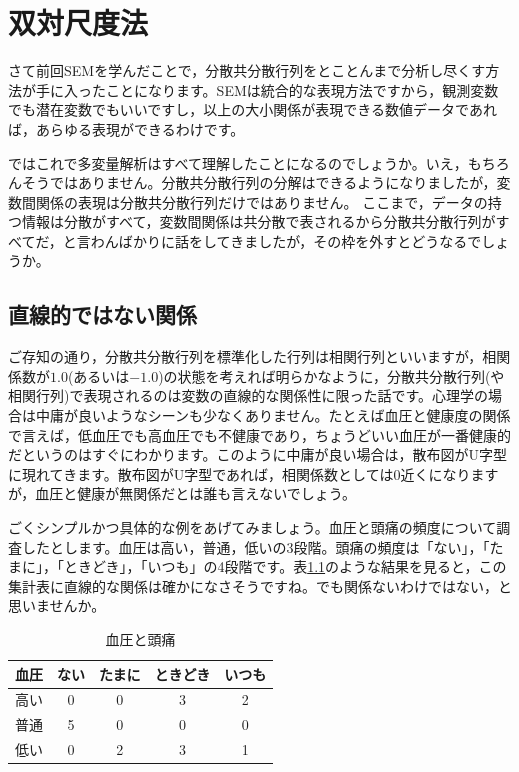 \documentclass{ltjsbook}
\begin{document}
\chapter{双対尺度法}
\label{x14_DualScaling}


さて前回SEMを学んだことで，分散共分散行列をとことんまで分析し尽くす方法が手に入ったことになります。SEMは統合的な表現方法ですから，観測変数でも潜在変数でもいいですし，以上の大小関係が表現できる数値データであれば，あらゆる表現ができるわけです。

ではこれで多変量解析はすべて理解したことになるのでしょうか。いえ，もちろんそうではありません。分散共分散行列の分解はできるようになりましたが，変数間関係の表現は分散共分散行列だけではありません。
ここまで，データの持つ情報は分散がすべて，変数間関係は共分散で表されるから分散共分散行列がすべてだ，と言わんばかりに話をしてきましたが，その枠を外すとどうなるでしょうか。

\section{直線的ではない関係}

ご存知の通り，分散共分散行列を標準化した行列は相関行列といいますが，相関係数が$1.0$(あるいは$-1.0$)の状態を考えれば明らかなように，分散共分散行列(や相関行列)で表現されるのは変数の直線的な関係性に限った話です。心理学の場合は中庸が良いようなシーンも少なくありません。たとえば血圧と健康度の関係で言えば，低血圧でも高血圧でも不健康であり，ちょうどいい血圧が一番健康的だというのはすぐにわかります。このように中庸が良い場合は，散布図がU字型に現れてきます。散布図がU字型であれば，相関係数としては0近くになりますが，血圧と健康が無関係だとは誰も言えないでしょう。

ごくシンプルかつ具体的な例をあげてみましょう。血圧と頭痛の頻度について調査したとします。血圧は高い，普通，低いの3段階。頭痛の頻度は「ない」，「たまに」，「ときどき」，「いつも」の4段階です。表\ref{tbl:14_01}のような結果を見ると，この集計表に直線的な関係は確かになさそうですね。でも関係ないわけではない，と思いませんか。
\begin{table}[ht]
	\begin{center}
		\caption{血圧と頭痛}
		\begin{tabular}{c|cccc}
			血圧 & ない & たまに & ときどき & いつも \\
			\hline
			高い & 0  & 0   & 3    & 2   \\
			普通 & 5  & 0   & 0    & 0   \\
			低い & 0  & 2   & 3    & 1   \\
		\end{tabular}
		\label{tbl:14_01}
	\end{center}
\end{table}
\end{document}
